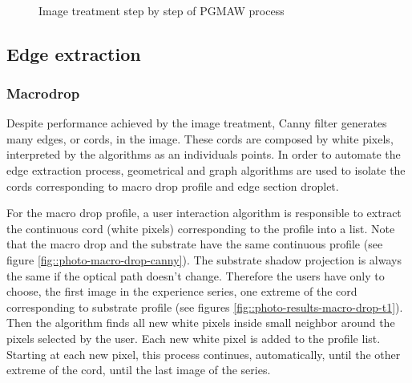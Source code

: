 \documentclass[12pt]{iopart}
\begin{document}
\begin{figure}[h!]
\begin{center}
\\
\end{center}
\caption{{\small Image treatment step by step of PGMAW process}}
\label{fig::photo-macro-drop}
\end{figure}


\subsection{Edge extraction}
\label{edge_extraction}

\subsubsection{Macrodrop}

Despite performance achieved by the image treatment, Canny filter
 generates many edges, or cords, in the image. These cords are composed
 by white pixels, interpreted by the algorithms as an individuals points.
 In order to automate the edge extraction process, geometrical and
 graph algorithms are used  to isolate the cords corresponding to
 macro drop profile and edge section droplet.

For the macro drop profile, a user interaction algorithm is responsible
 to extract the continuous cord (white pixels) corresponding
 to the profile into a list. Note  that the macro drop and 
the substrate have the same continuous profile (see figure \ref{fig::photo-macro-drop-canny}).
 The substrate shadow projection is always the same if the optical
 path doesn't change. Therefore the users have only to choose, the
 first image in the experience series, one extreme  of the cord 
corresponding to substrate profile (see figures \ref{fig::photo-results-macro-drop-t1}).
 Then the algorithm finds all new white pixels inside small neighbor around
 the pixels selected by the user. Each new white pixel  is added to the
 profile list. Starting at each new pixel, this process continues,
 automatically, until the other extreme of the cord, until the last
 image of the series.
 
\end{document}
